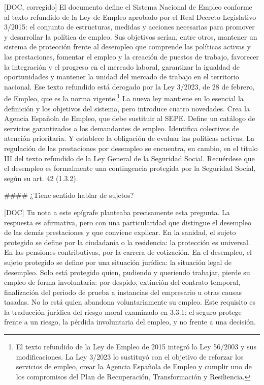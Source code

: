 \documentclass[10pt,a4paper]{article}
\begin{document}
[DOC, corregido] El documento define el Sistema Nacional de Empleo conforme al texto refundido de la Ley de Empleo aprobado por el Real Decreto Legislativo 3/2015: el conjunto de estructuras, medidas y acciones necesarias para promover y desarrollar la política de empleo. Sus objetivos serían, entre otros, mantener un sistema de protección frente al desempleo que comprende las políticas activas y las prestaciones, fomentar el empleo y la creación de puestos de trabajo, favorecer la integración y el progreso en el mercado laboral, garantizar la igualdad de oportunidades y mantener la unidad del mercado de trabajo en el territorio nacional. Ese texto refundido está derogado por la Ley 3/2023, de 28 de febrero, de Empleo, que es la norma vigente.\footnote{%
    El texto refundido de la Ley de Empleo de 2015 integró la Ley 56/2003 y sus modificaciones. La Ley 3/2023 lo sustituyó con el objetivo de reforzar los servicios de empleo, crear la Agencia Española de Empleo y cumplir uno de los compromisos del Plan de Recuperación, Transformación y Resiliencia.
} La nueva ley mantiene en lo esencial la definición y los objetivos del sistema, pero introduce cuatro novedades. Crea la Agencia Española de Empleo, que debe sustituir al SEPE. Define un catálogo de servicios garantizados a los demandantes de empleo. Identifica colectivos de atención prioritaria. Y establece la obligación de evaluar las políticas activas. La regulación de las prestaciones por desempleo se encuentra, en cambio, en el título III del texto refundido de la Ley General de la Seguridad Social. Recuérdese que el desempleo es formalmente una contingencia protegida por la Seguridad Social, según su art. 42 (1.3.2).








#### ¿Tiene sentido hablar de sujetos?

[DOC] Tu nota a este epígrafe planteaba precisamente esta pregunta. La respuesta es afirmativa, pero con una particularidad que distingue el desempleo de las demás prestaciones y que conviene explicar. En la sanidad, el sujeto protegido se define por la ciudadanía o la residencia: la protección es universal. En las pensiones contributivas, por la carrera de cotización. En el desempleo, el sujeto protegido se define por una situación jurídica: la situación legal de desempleo. Solo está protegido quien, pudiendo y queriendo trabajar, pierde su empleo de forma involuntaria: por despido, extinción del contrato temporal, finalización del periodo de prueba a instancias del empresario u otras causas tasadas. No lo está quien abandona voluntariamente su empleo. Este requisito es la traducción jurídica del riesgo moral examinado en 3.3.1: el seguro protege frente a un riesgo, la pérdida involuntaria del empleo, y no frente a una decisión.
\end{document}

